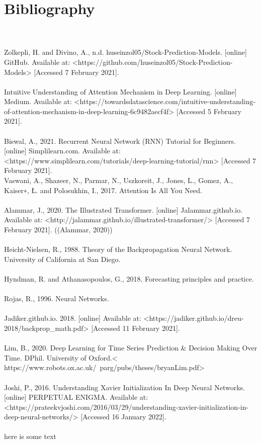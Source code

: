 \documentclass{article}
\begin{document}
\section{Bibliography}
\\
\\
Zolkepli, H. and Divino, A., n.d. huseinzol05/Stock-Prediction-Models. [online] GitHub. Available at: <https://github.com/huseinzol05/Stock-Prediction-Models> [Accessed 7 February 2021].
\\
\\Intuitive Understanding of Attention Mechanism in Deep Learning. [online] Medium. Available at: <https://towardsdatascience.com/intuitive-understanding-of-attention-mechanism-in-deep-learning-6c9482aecf4f> [Accessed 5 February 2021].
\\
\\
Biswal, A., 2021. Recurrent Neural Network (RNN) Tutorial for Beginners. [online] Simplilearn.com. Available at: <https://www.simplilearn.com/tutorials/deep-learning-tutorial/rnn> [Accessed 7 February 2021].
\\
Vaswani, A., Shazeer, N., Parmar, N., Uszkoreit, J., Jones, L., Gomez, A., Kaiser∗, Ł. and Polosukhin, I., 2017. Attention Is All You Need.
\\
\\
Alammar, J., 2020. The Illustrated Transformer. [online] Jalammar.github.io. Available at: <http://jalammar.github.io/illustrated-transformer/> [Accessed 7 February 2021].
((Alammar, 2020))
\\
\\Heicht-Nielsen, R., 1988. Theory of the Backpropagation Neural Network. University of California at San Diego.
\\\\
Hyndman, R. and Athanasopoulos, G., 2018. Forecasting principles and practice.
\\\\
Rojas, R., 1996. Neural Networks.
\\\\
Jadiker.github.io. 2018. [online] Available at: <https://jadiker.github.io/dreu-2018/backprop_math.pdf> [Accessed 11 February 2021].
\\\\
Lim, B., 2020. Deep Learning for Time Series Prediction & Decision Making Over Time. DPhil. University of Oxford.< https://www.robots.ox.ac.uk/~parg/pubs/theses/bryanLim.pdf>
\\\\
Joshi, P., 2016. Understanding Xavier Initialization In Deep Neural Networks. [online] PERPETUAL ENIGMA. Available at: <https://prateekvjoshi.com/2016/03/29/understanding-xavier-initialization-in-deep-neural-networks/> [Accessed 16 January 2022].
\\\\


\clearpage
here is some text
\printbibliography
{}
\end{document}
